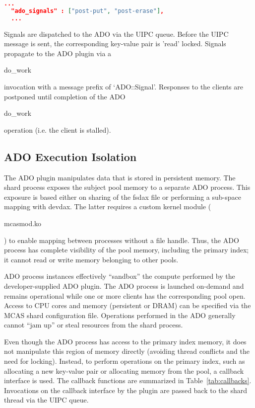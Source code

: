 \documentclass[letterpaper,twocolumn,10pt]{article}
\newcommand{\code}[1]{\begin{ttcodefont}#1\end{ttcodefont}}
\begin{document}
\begin{lstlisting}[language=json,
    caption={Shard-level ADO Signal Configuration},
    captionpos=b, label={lst:adosignalconf}]
  ...
  "ado_signals" : ["post-put", "post-erase"],
  ...
\end{lstlisting}

Signals are dispatched to the ADO via the UIPC queue. Before the UIPC
message is sent, the corresponding key-value pair is 'read' locked.
Signals propagate to the ADO plugin via a \code{do\_work} invocation
with a message prefix of `ADO::Signal'.  Responses to the clients are
postponed until completion of the ADO \code{do\_work} operation
(i.e. the client is stalled).

\subsection{ADO Execution Isolation}

The ADO plugin manipulates data that is
stored in persistent memory.  The shard process exposes the subject
pool memory to a separate ADO process.  This exposure is based either
on sharing of the fsdax file or performing a sub-space mapping with
devdax.  The latter requires a custom kernel module
(\code{mcasmod.ko}) to enable mapping between processes without a file
handle. Thus, the ADO process has complete visibility of the pool
memory, including the primary index; it cannot read or write memory
belonging to other pools.

ADO process instances effectively ``sandbox'' the compute performed by
the developer-supplied ADO plugin. The ADO process is launched on-demand and
remains operational while one or more clients has the corresponding
pool open.  Access to CPU cores and memory (persistent or DRAM) can be
specified via the MCAS shard configuration file. Operations performed
in the ADO generally cannot ``jam up'' or steal resources from the shard process.

Even though the ADO process has access to the primary index memory, it
does not manipulate this region of memory directly (avoiding thread
conflicts and the need for locking).  Instead, to perform operations
on the primary index, such as allocating a new key-value pair or
allocating memory from the pool, a callback interface is used.  The
callback functions are summarized in Table~\ref{tab:callbacks}.
Invocations on the callback interface by the plugin are passed back to
the shard thread via the UIPC queue.   
\end{document}
